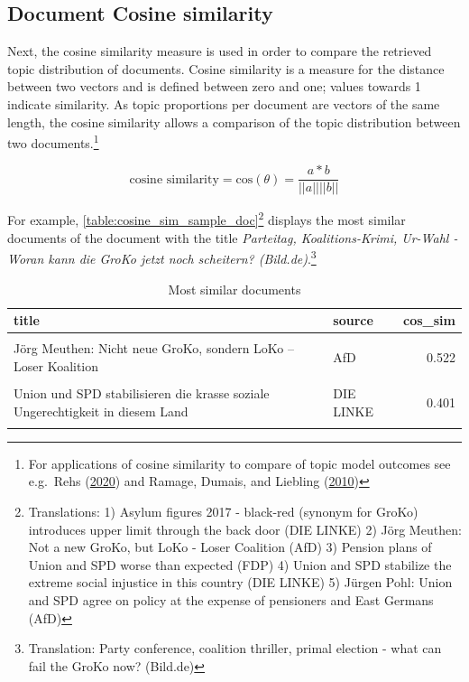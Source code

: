 \documentclass[
]{article}
\begin{document}
\hypertarget{document-cosine-similarity}{%
\subsection{Document Cosine
similarity}\label{document-cosine-similarity}}

Next, the cosine similarity measure is used in order to compare the
retrieved topic distribution of documents. Cosine similarity is a
measure for the distance between two vectors and is defined between zero
and one; values towards 1 indicate similarity. As topic proportions per
document are vectors of the same length, the cosine similarity allows a
comparison of the topic distribution between two documents.\footnote{For
  applications of cosine similarity to compare of topic model outcomes
  see e.g.~Rehs (\protect\hyperlink{ref-rehs_structural_2020}{2020}) and
  Ramage, Dumais, and Liebling
  (\protect\hyperlink{ref-ramage_characterizing_2010}{2010})}

\[
\text{cosine similarity} = \text{cos}(\theta)=\frac{a*b}{||a|| ||b||}
\]

For example, \autoref{table:cosine_sim_sample_doc}\footnote{Translations:
  1) Asylum figures 2017 - black-red (synonym for GroKo) introduces
  upper limit through the back door (DIE LINKE) 2) Jörg Meuthen: Not a
  new GroKo, but LoKo - Loser Coalition (AfD) 3) Pension plans of Union
  and SPD worse than expected (FDP) 4) Union and SPD stabilize the
  extreme social injustice in this country (DIE LINKE) 5) Jürgen Pohl:
  Union and SPD agree on policy at the expense of pensioners and East
  Germans (AfD)} displays the most similar documents of the document
with the title \emph{Parteitag, Koalitions-Krimi, Ur-Wahl - Woran kann
die GroKo jetzt noch scheitern? (Bild.de)}.\footnote{Translation: Party
  conference, coalition thriller, primal election - what can fail the
  GroKo now? (Bild.de)}

\begin{table}[H]

\caption{\label{tab:Documents with highest similarity}Most similar documents \label{table:cosine_sim_sample_doc}}
\centering
\fontsize{7}{9}\selectfont
\begin{tabular}[t]{llr}
\toprule
title & source & cos\_sim\\
\midrule
\cellcolor{gray!6}{Asylzahlen 2017 - schwarz-rot führt Obergrenze durch die Hintertür ein} & \cellcolor{gray!6}{DIE LINKE} & \cellcolor{gray!6}{0.542}\\
Jörg Meuthen: Nicht neue GroKo, sondern LoKo – Loser Koalition & AfD & 0.522\\
\cellcolor{gray!6}{Rentenpläne von Union und SPD schlimmer als erwartet} & \cellcolor{gray!6}{FDP} & \cellcolor{gray!6}{0.478}\\
Union und SPD stabilisieren die krasse soziale Ungerechtigkeit in diesem Land & DIE LINKE & 0.401\\
\cellcolor{gray!6}{Jürgen Pohl: Union und SPD verabreden Politik zu Lasten von Rentnern und Ostdeutschen} & \cellcolor{gray!6}{AfD} & \cellcolor{gray!6}{0.388}\\
\bottomrule
\end{tabular}
\end{table}
\end{document}
